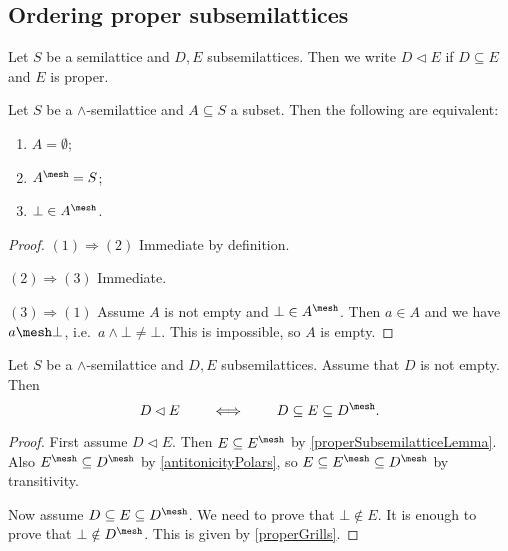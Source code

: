 \subsection{Ordering proper subsemilattices}
\begin{definition}
Let $S$ be a semilattice and $D,E$ subsemilattices. Then we write $D\lhd E$ if $D\subseteq E$ and $E$ is proper.
\end{definition}

\begin{lemma} \label{properGrills}
Let $S$ be a $\wedge$-semilattice and $A\subseteq S$ a subset. Then the following are equivalent:
\begin{enumerate}
\item $A = \emptyset$;
\item $A^\mesh = S$;
\item $\bot \in A^\mesh$.
\end{enumerate}
\end{lemma}
\begin{proof}
$(1) \Rightarrow (2)$ Immediate by definition.

$(2) \Rightarrow (3)$ Immediate.

$(3) \Rightarrow (1)$ Assume $A$ is not empty and $\bot\in A^\mesh$. Then $a\in A$ and we have $a \mesh \bot$, i.e.\ $a\wedge \bot \neq \bot$. This is impossible, so $A$ is empty.
\end{proof}

\begin{proposition}
Let $S$ be a $\wedge$-semilattice and $D,E$ subsemilattices. Assume that $D$ is not empty. Then
\[ D \lhd E \qquad\iff\qquad D\subseteq E \subseteq D^\mesh. \]
\end{proposition}
\begin{proof}
First assume $D \lhd E$. Then $E\subseteq E^\mesh$ by \ref{properSubsemilatticeLemma}. Also $E^\mesh \subseteq D^\mesh$ by \ref{antitonicityPolars}, so $E\subseteq E^\mesh \subseteq D^\mesh$ by transitivity.

Now assume $D\subseteq E \subseteq D^\mesh$. We need to prove that $\bot\notin E$. It is enough to prove that $\bot \notin D^\mesh$. This is given by \ref{properGrills}.
\end{proof}


